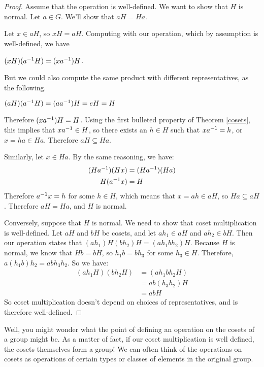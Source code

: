 \begin{proof}

Assume that the operation is well-defined. We want to show that $H$ is normal. Let $a \in G$. We'll show that $aH = Ha$.

Let $x \in aH$, so $xH = aH$. Computing with our operation, which by assumption is well-defined, we have

\begin{center}
    $(xH)(a^{-1} H) = (xa^{-1})H$.
\end{center}

But we could also compute the same product with different representatives, as the following.

\begin{center}
    $(aH)(a^{-1} H) = (a a^{-1})H = eH = H$
\end{center}

Therefore $(xa^{-1})H = H$. Using the first bulleted property of Theorem \ref{cosets}, this implies that $xa^{-1} \in H$, so there exists an $h \in H$ such that $xa^{-1} = h$, or $x = ha \in Ha$. Therefore $aH \subseteq Ha$.

Similarly, let $x \in Ha$. By the same reasoning, we have:
\begin{align*}
    (Ha^{-1})(Hx) &= (Ha^{-1})(Ha) \\
    H(a^{-1} x) &= H
\end{align*}
Therefore $a^{-1} x = h$ for some $h \in H$, which means that $x = ah \in aH$, so $Ha \subseteq aH$. Therefore $aH = Ha$, and $H$ is normal.

Conversely, suppose that $H$ is normal. We need to show that coset multiplication is well-defined. Let $aH$ and $bH$ be cosets, and let $ah_1 \in aH$ and $ah_2 \in bH$. Then our operation states that $(ah_1)H(bh_2)H = (ah_1bh_2)H$. Because $H$ is normal, we know that $Hb = bH$, so $h_1 b = b h_3$ for some $h_3 \in H$. Therefore, $a\left(h_1b\right) h_2 = ab h_3 h_2$. So we have:
\begin{align*}
    \left(ah_1 H\right)\left(bh_2 H\right) &= \left(ah_1bh_2 H\right) \\
    &= ab\left(h_3 h_2\right)H \\
    &= ab H
\end{align*}
So coset multiplication doesn't depend on choices of representatives, and is therefore well-defined.

\end{proof}

Well, you might wonder what the point of defining an operation on the cosets of a group might be. As a matter of fact, if our coset multiplication is well defined, the cosets themselves form a group! We can often think of the operations on cosets as operations of certain types or classes of elements in the original group.

